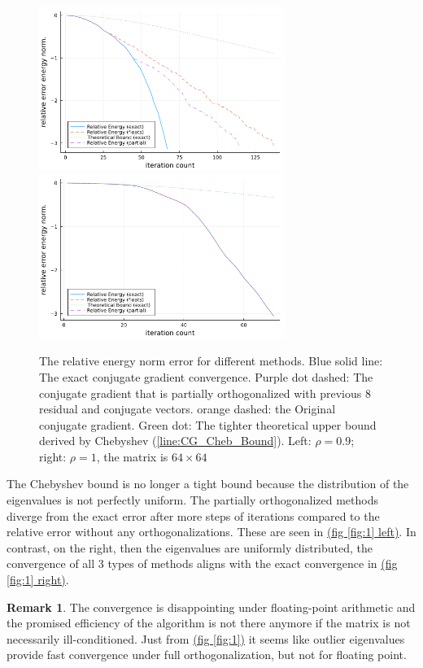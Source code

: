 \documentclass[]{article}
\theoremstyle{definition}
\newtheorem{remark}{Remark}[subsection]  %
\begin{document}
        \begin{figure}[h]
            
            \centering
            \includegraphics[width=8cm]{cg_convergence_0.9.png}
            \includegraphics[width=8cm]{cg_convergence_1.png}
            \caption{
                The relative energy norm error for different methods. Blue solid line: The exact conjugate gradient convergence. Purple dot dashed: The conjugate gradient that is partially orthogonalized with previous 8 residual and conjugate vectors. orange dashed: the Original conjugate gradient. Green dot: The tighter theoretical upper bound derived by Chebyshev (\hyperref[line:CG_Cheb_Bound]{\ref*{line:CG_Cheb_Bound}}). Left: $\rho = 0.9$; right: $\rho = 1$, the matrix is $64\times 64$
            }
        \end{figure}\label{fig:1}
        The Chebyshev bound is no longer a tight bound because the distribution of the eigenvalues is not perfectly uniform. The partially orthogonalized methods diverge from the exact error after more steps of iterations compared to the relative error without any orthogonalizations. These are seen in \hyperref[fig:1]{(fig \ref*{fig:1} left)}. In contrast, on the right, then the eigenvalues are uniformly distributed, the convergence of all 3 types of methods aligns with the exact convergence in \hyperref[fig:1]{(fig \ref*{fig:1} right)}. 
        \begin{remark}
            The convergence is disappointing under floating-point arithmetic and the promised efficiency of the algorithm is not there anymore if the matrix is not necessarily ill-conditioned. Just from \hyperref[fig:1]{(fig \ref*{fig:1})} it seems like outlier eigenvalues provide fast convergence under full orthogonalization, but not for floating point. 
        \end{remark}
\end{document}
